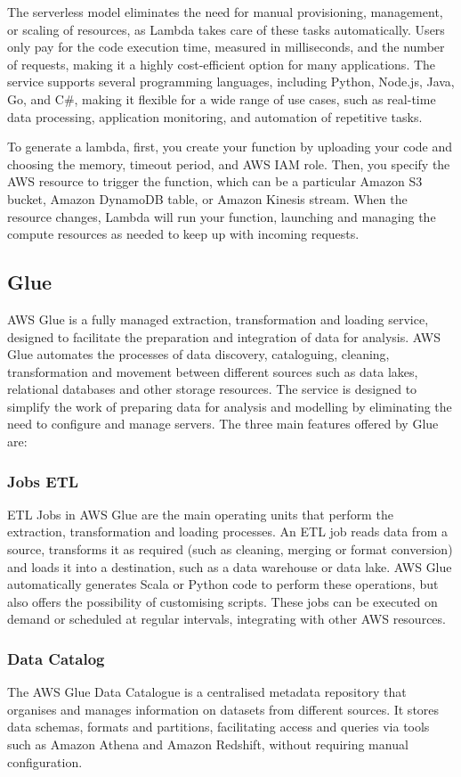 The serverless model eliminates the need for manual provisioning, management, or scaling of resources, as Lambda takes care of these tasks automatically. Users only pay for the code execution time, measured in milliseconds, and the number of requests, making it a highly cost-efficient option for many applications. The service supports several programming languages, including Python, Node.js, Java, Go, and C\#, making it flexible for a wide range of use cases, such as real-time data processing, application monitoring, and automation of repetitive tasks.

To generate a lambda, first, you create your function by uploading your code and choosing the memory, timeout period, and \ac{AWS} \ac{IAM} role. Then, you specify the \ac{AWS} resource to trigger the function, which can be a particular Amazon \ac{S3} bucket, Amazon DynamoDB table, or  Amazon Kinesis stream. When the resource changes, Lambda will run your function, launching and managing the compute resources as needed to keep up with incoming requests.
\subsection{Glue}\label{sec:glue}
\ac{AWS} Glue is a fully managed extraction, transformation and loading service, designed to facilitate the preparation and integration of data for analysis. \ac{AWS} Glue automates the processes of data discovery, cataloguing, cleaning, transformation and movement between different sources such as data lakes, relational databases and other storage resources. The service is designed to simplify the work of preparing data for analysis and modelling by eliminating the need to configure and manage servers. The three main features offered by Glue are:
\subsubsection{Jobs ETL}
\ac{ETL} Jobs in \ac{AWS} Glue are the main operating units that perform the extraction, transformation and loading processes. An \ac{ETL} job reads data from a source, transforms it as required (such as cleaning, merging or format conversion) and loads it into a destination, such as a data warehouse or data lake. \ac{AWS} Glue automatically generates Scala or Python code to perform these operations, but also offers the possibility of customising scripts. These jobs can be executed on demand or scheduled at regular intervals, integrating with other \ac{AWS} resources.
\subsubsection{Data Catalog}
The \ac{AWS} Glue Data Catalogue is a centralised metadata repository that organises and manages information on datasets from different sources. It stores data schemas, formats and partitions, facilitating access and queries via tools such as Amazon Athena and Amazon Redshift, without requiring manual configuration.
